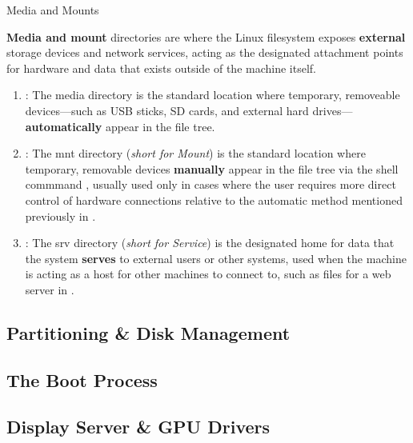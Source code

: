 \documentclass[10pt]{article}
\begin{document}
    \begin{core}{Media and Mounts}

      \textbf{Media and mount} directories are where the Linux filesystem exposes \textbf{external} storage devices and network services, acting as the designated attachment points for hardware and data that exists outside of the machine itself.

      \begin{enumerate}

        \item {} : The media directory is the standard location where temporary, removeable devices---such as USB sticks, SD cards, and external hard drives---\textbf{automatically} appear in the file tree.

        \item {} : The mnt directory (\textit{short for Mount}) is the standard location where temporary, removable devices \textbf{manually} appear in the file tree via the shell commmand , usually used only in cases where the user requires more direct control of hardware connections relative to the automatic method mentioned previously in .

        \item {} : The srv directory (\textit{short for Service}) is the designated home for data that the system \textbf{serves} to external users or other systems, used when the machine is acting as a host for other machines to connect to, such as files for a web server in .

      \end{enumerate}

    \end{core}

  \subsection{Partitioning \& Disk Management}

  \subsection{The Boot Process}

  \subsection{Display Server \& GPU Drivers}
\end{document}
